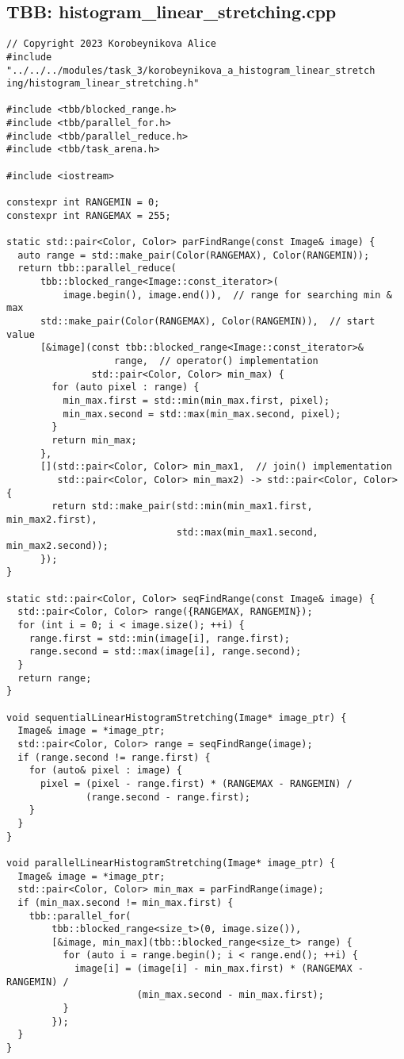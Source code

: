 \documentclass[14pt, russian]{extarticle}
\begin{document}
	\subsection{TBB: histogram\_linear\_stretching.cpp}
	\begin{lstlisting}
// Copyright 2023 Korobeynikova Alice
#include "../../../modules/task_3/korobeynikova_a_histogram_linear_stretch ing/histogram_linear_stretching.h"

#include <tbb/blocked_range.h>
#include <tbb/parallel_for.h>
#include <tbb/parallel_reduce.h>
#include <tbb/task_arena.h>

#include <iostream>

constexpr int RANGEMIN = 0;
constexpr int RANGEMAX = 255;

static std::pair<Color, Color> parFindRange(const Image& image) {
  auto range = std::make_pair(Color(RANGEMAX), Color(RANGEMIN));
  return tbb::parallel_reduce(
      tbb::blocked_range<Image::const_iterator>(
          image.begin(), image.end()),  // range for searching min & max
      std::make_pair(Color(RANGEMAX), Color(RANGEMIN)),  // start value
      [&image](const tbb::blocked_range<Image::const_iterator>&
                   range,  // operator() implementation
               std::pair<Color, Color> min_max) {
        for (auto pixel : range) {
          min_max.first = std::min(min_max.first, pixel);
          min_max.second = std::max(min_max.second, pixel);
        }
        return min_max;
      },
      [](std::pair<Color, Color> min_max1,  // join() implementation
         std::pair<Color, Color> min_max2) -> std::pair<Color, Color> {
        return std::make_pair(std::min(min_max1.first, min_max2.first),
                              std::max(min_max1.second, min_max2.second));
      });
}

static std::pair<Color, Color> seqFindRange(const Image& image) {
  std::pair<Color, Color> range({RANGEMAX, RANGEMIN});
  for (int i = 0; i < image.size(); ++i) {
    range.first = std::min(image[i], range.first);
    range.second = std::max(image[i], range.second);
  }
  return range;
}

void sequentialLinearHistogramStretching(Image* image_ptr) {
  Image& image = *image_ptr;
  std::pair<Color, Color> range = seqFindRange(image);
  if (range.second != range.first) {
    for (auto& pixel : image) {
      pixel = (pixel - range.first) * (RANGEMAX - RANGEMIN) /
              (range.second - range.first);
    }
  }
}

void parallelLinearHistogramStretching(Image* image_ptr) {
  Image& image = *image_ptr;
  std::pair<Color, Color> min_max = parFindRange(image);
  if (min_max.second != min_max.first) {
    tbb::parallel_for(
        tbb::blocked_range<size_t>(0, image.size()),
        [&image, min_max](tbb::blocked_range<size_t> range) {
          for (auto i = range.begin(); i < range.end(); ++i) {
            image[i] = (image[i] - min_max.first) * (RANGEMAX - RANGEMIN) /
                       (min_max.second - min_max.first);
          }
        });
  }
}
	\end{lstlisting}
	\newpage
\end{document}

